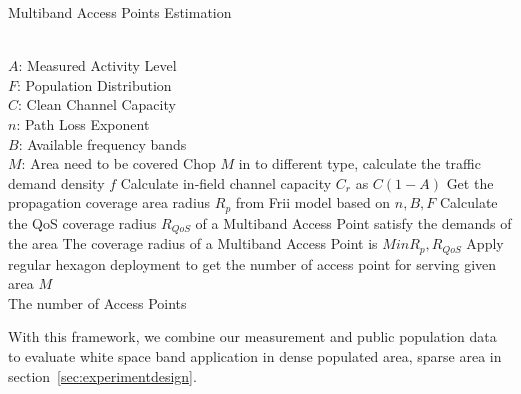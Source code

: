 \begin{algorithm}[t]
    \small
\caption{Multiband Access Points Estimation}
\label{algorithm:mape}
\begin{algorithmic}[1]
\REQUIRE  ~~\\
	$A$: Measured Activity Level \\
	$F$: Population Distribution\\
	$C$: Clean Channel Capacity\\
	$n$: Path Loss Exponent \\
	$B$: Available frequency bands\\
	$M$: Area need to be covered
\STATE Chop $M$ in to different type, calculate the traffic demand density $f$
\STATE Calculate in-field channel capacity $C_r$ as $C(1-A)$  
\STATE Get the propagation coverage area radius $R_p$ from Frii model based on $n,B,F$
\STATE Calculate the QoS coverage radius $R_{QoS}$ of a Multiband Access Point satisfy the demands of the area
\STATE The coverage radius of a Multiband Access Point is $Min{R_p,R_{QoS}}$
\STATE Apply regular hexagon deployment to get the number of access point for serving given area $M$ 
\ENSURE ~~\\    
 The number of Access Points\\
\end{algorithmic}
\end{algorithm}

With this framework, we combine our measurement and public population data to evaluate white
 space band application in dense populated area, sparse area in section~\ref{sec:experimentdesign}.



